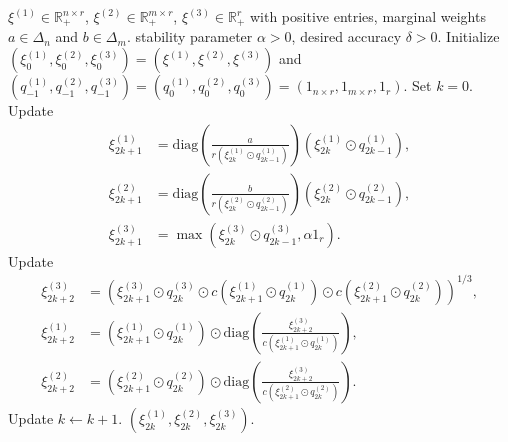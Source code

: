 \documentclass{article}
\theoremstyle{definition}
\newcommand{\R}{\mathbb{R}}
\begin{document}
\begin{algorithm}[!htbp]
    \caption{$\mathsf{Dykstra}(\xi^{(1)}, \xi^{(2)}, \xi^{(3)}, a, b, \alpha, \delta)$}
    \label{alg:dykstra}
    \begin{algorithmic}[1]
        \Input $\xi^{(1)} \in \R_+^{n \times r}$, $\xi^{(2)} \in \R_+^{m \times r}$, $\xi^{(3)} \in \R_+^r$ with positive entries, marginal weights $a \in \Delta_n$ and $b \in \Delta_m$.
        \Input stability parameter $\alpha > 0$, desired accuracy $\delta > 0$.
        \State Initialize $(\xi_0^{(1)}, \xi_0^{(2)}, \xi_0^{(3)}) = (\xi^{(1)}, \xi^{(2)}, \xi^{(3)})$ and $(q_{-1}^{(1)}, q_{-1}^{(2)}, q_{-1}^{(3)}) = (q_0^{(1)}, q_0^{(2)}, q_0^{(3)}) = (1_{n \times r}, 1_{m \times r}, 1_r)$. 
        \State Set $k = 0$.
            \State Update
            \begin{equation}
                \label{eq:dykstra_projection1}
                \begin{aligned}
                    \xi_{2 k + 1}^{(1)} & = \mathrm{diag}\left(\frac{a}{r(\xi_{2 k}^{(1)} \odot q_{2 k - 1}^{(1)})}\right) (\xi_{2 k}^{(1)} \odot q_{2 k - 1}^{(1)}), \\
                    \xi_{2 k + 1}^{(2)} & = \mathrm{diag}\left(\frac{b}{r(\xi_{2 k}^{(2)} \odot q_{2 k - 1}^{(2)})}\right) (\xi_{2 k}^{(2)} \odot q_{2 k - 1}^{(2)}), \\
                    \xi_{2 k + 1}^{(3)} & = \max\left(\xi_{2 k}^{(3)} \odot q_{2 k - 1}^{(3)}, \alpha 1_r\right).
                \end{aligned}
            \end{equation}
            \State Update
            \begin{equation}
                \label{eq:dykstra_projection2}
                \begin{aligned}
                    \xi_{2 k + 2}^{(3)} & = \left(\xi_{2 k + 1}^{(3)} \odot q_{2 k }^{(3)} \odot c(\xi_{2 k + 1}^{(1)} \odot q_{2 k}^{(1)}) \odot c(\xi_{2 k + 1}^{(2)} \odot q_{2 k}^{(2)})\right)^{1 / 3}, \\
                    \xi_{2 k + 2}^{(1)} & = (\xi_{2 k + 1}^{(1)} \odot q_{2 k}^{(1)}) \odot \mathrm{diag}\left(\frac{\xi_{2 k + 2}^{(3)}}{c(\xi_{2 k + 1}^{(1)} \odot q_{2 k}^{(1)})}\right), \\
                    \xi_{2 k + 2}^{(2)} & = (\xi_{2 k + 1}^{(2)} \odot q_{2 k}^{(2)}) \odot \mathrm{diag}\left(\frac{\xi_{2 k + 2}^{(3)}}{c(\xi_{2 k + 1}^{(2)} \odot q_{2 k}^{(2)})}\right).
                \end{aligned}
            \end{equation}
            \State Update $k \leftarrow k + 1$.
        \EndWhile
        \Output $(\xi_{2 k}^{(1)}, \xi_{2 k}^{(2)}, \xi_{2 k}^{(3)})$.
    \end{algorithmic}
\end{algorithm}
\end{document}
